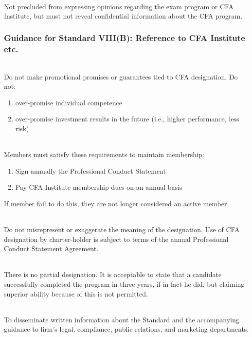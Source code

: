 \begin{remark} \\
Not precluded from expressing opinions regarding the exam program or CFA Institute, but must not reveal confidential information about the CFA program.
\end{remark}

\subsubsection{Guidance for Standard VIII(B): Reference to CFA Institute etc.}

\begin{remark} \\
Do not make promotional promises or guarantees tied to CFA designation. Do not:
\begin{enumerate}[label=\roman*.]
\setlength{\itemsep}{0pt}
\item over-promise individual competence
\item over-promise investment results in the future (i.e., higher performance, less risk)
\end{enumerate}
\end{remark}

\begin{remark} \\
Members must satisfy these requirements to maintain membership:
\begin{enumerate}[label=\roman*.]
\setlength{\itemsep}{0pt}
\item Sign annually the Professional Conduct Statement
\item Pay CFA Institute membership dues on an annual basis
\end{enumerate}
If member fail to do this, they are not longer considered an active member.
\end{remark}

\begin{remark} \\
Do not misrepresent or exaggerate the meaning of the designation. Use of CFA designation by charter-holder is subject to terms of the annual Professional Conduct Statement Agreement.
\end{remark}

\begin{remark} \\
There is no partial designation. It is acceptable to state that a candidate successfully completed the program in three years, if in fact he did, but claiming superior ability because of this is not permitted.
\end{remark}

\begin{remark} \\
To disseminate written information about the Standard and the accompanying guidance to firm’s legal, compliance, public relations, and marketing departments.
\end{remark}